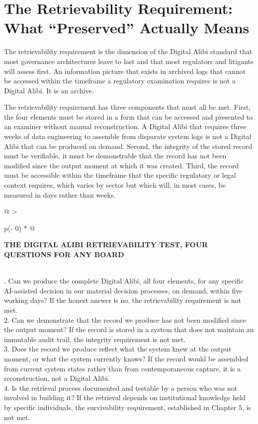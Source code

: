 \section{The Retrievability Requirement: What ``Preserved'' Actually Means}

The retrievability requirement is the dimension of the Digital Alibi standard that most governance architectures leave to last and that most regulators and litigants will assess first. An information picture that exists in archived logs that cannot be accessed within the timeframe a regulatory examination requires is not a Digital Alibi. It is an archive.

The retrievability requirement has three components that must all be met. First, the four elements must be stored in a form that can be accessed and presented to an examiner without manual reconstruction. A Digital Alibi that requires three weeks of data engineering to assemble from disparate system logs is not a Digital Alibi that can be produced on demand. Second, the integrity of the stored record must be verifiable, it must be demonstrable that the record has not been modified since the output moment at which it was created. Third, the record must be accessible within the timeframe that the specific regulatory or legal context requires, which varies by sector but which will, in most cases, be measured in days rather than weeks.

\begin{longtable}[]{@{}
  >{\raggedright\arraybackslash}p{(\columnwidth - 0\tabcolsep) * }@{}}
\toprule\noalign{}
\begin{minipage}[b]{\linewidth}\raggedright
\textbf{THE DIGITAL ALIBI RETRIEVABILITY TEST, FOUR QUESTIONS FOR ANY BOARD}
\end{minipage} \\
\midrule\noalign{}
\endhead
\bottomrule\noalign{}
. Can we produce the complete Digital Alibi, all four elements, for any specific AI-assisted decision in our material decision processes, on demand, within five working days? If the honest answer is no, the retrievability requirement is not met. \\
2. Can we demonstrate that the record we produce has not been modified since the output moment? If the record is stored in a system that does not maintain an immutable audit trail, the integrity requirement is not met. \\
3. Does the record we produce reflect what the system knew at the output moment, or what the system currently knows? If the record would be assembled from current system states rather than from contemporaneous capture, it is a reconstruction, not a Digital Alibi. \\
4. Is the retrieval process documented and testable by a person who was not involved in building it? If the retrieval depends on institutional knowledge held by specific individuals, the survivability requirement, established in Chapter 5, is not met. \\
\end{longtable}

